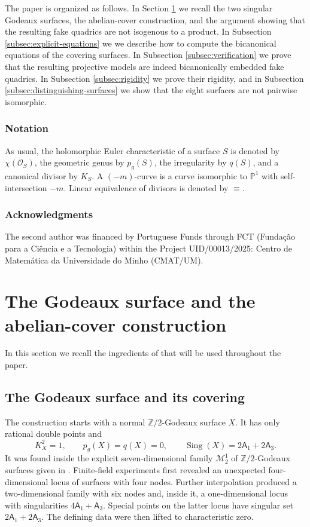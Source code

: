 \documentclass[11pt,a4paper]{article}
\newcommand{\ZZ}{\mathbb Z}
\newcommand{\Sing}{\operatorname{Sing}}
\begin{document}
The paper is organized as follows. In Section \ref{sec:godeaux-construction} we recall
the two singular Godeaux surfaces, the abelian-cover construction, and the argument 
showing that the resulting fake quadrics are not isogenous to a product. 
In Subsection \ref{subsec:explicit-equations} we we describe how to compute the 
bicanonical equations of the covering surfaces. 
In Subsection \ref{subsec:verification} we prove that the 
resulting projective models are indeed bicanonically embedded fake quadrics. 
In Subsection \ref{subsec:rigidity} we prove their rigidity,
and in Subsection \ref{subsec:distinguishing-surfaces} we show that the eight surfaces
are not pairwise isomorphic.

\subsubsection*{Notation}

As usual, the holomorphic Euler characteristic of a surface \(S\) is
denoted by \(\chi(\mathcal O_S)\), the geometric genus by \(p_g(S)\),
the irregularity by \(q(S)\), and a canonical divisor by \(K_S\).
A $(-m)$-curve is a curve isomorphic to $\mathbb P^1$ with self-intersection $-m$.
Linear equivalence of divisors is denoted by $\equiv$.

\subsubsection*{Acknowledgments}

The second author was financed by Portuguese Funds through FCT
(Funda\c{c}\~ao para a Ci\^encia e a Tecnologia) within the Project
UID/00013/2025: Centro de Matem\'atica da Universidade do Minho (CMAT/UM).



\section{The Godeaux surface and the abelian-cover construction}
\label{sec:godeaux-construction}

In this section we recall the ingredients of \cite{RitoExplicitFQ} that will
be used throughout the paper.

\subsection{The Godeaux surface and its covering}\label{subsec:singular-godeaux}

The construction starts with a normal $\ZZ/2$-Godeaux surface $X$.  It has
only rational double points and
\[
 K_X^2=1,\qquad p_g(X)=q(X)=0,\qquad
 \Sing(X)=2\mathsf A_1+2\mathsf A_3.
\]
It was found inside the explicit seven-dimensional family $\mathcal M_2^1$ of
$\ZZ/2$-Godeaux surfaces given in \cite{DiasRito}.  Finite-field
experiments first revealed an unexpected four-dimensional locus of surfaces
with four nodes.  Further interpolation produced a two-dimensional family
with six nodes and, inside it, a one-dimensional locus with singularities
$4\mathsf A_1+\mathsf A_3$.  Special points on the latter locus have singular set
$2\mathsf A_1+2\mathsf A_3$.  The defining data were then lifted to characteristic zero.
\end{document}
